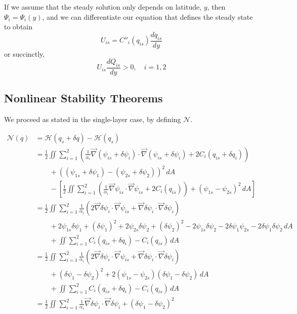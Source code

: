 \documentclass[12pt]{article}
\begin{document}
If we assume that the steady solution only depends on latitude, $y$, then $\Psi_i = \Psi_i(y)$, and we can differentiate our equation that defines the steady state to obtain
$$
U_{is} = C''_i(q_{is}) \frac{dq_{is}}{dy}
$$
or succinctly,
$$
U_{is} \frac{d Q_{is}}{dy} > 0, \quad i=1,2
$$

\subsection{Nonlinear Stability Theorems}
We proceed as stated in the single-layer case, by defining $\mathcal{N}$.

\begin{align*}
\mathcal{N}(q) 
& = \mathcal{H}(q_s + \delta q) - \mathcal{H}(q_s) \\
&= \frac12 \iint \sum_{i=1}^2 \left( \frac{1}{\alpha_i}\vec\nabla (\psi_{is} + \delta\psi_i) \cdot \vec\nabla (\psi_{is} + \delta\psi_i) + 2C_i(q_{is} + \delta q_i) \right) \\
&\quad\quad + ((\psi_{1s} + \delta\psi_1) - (\psi_{2s} + \delta\psi_2))^2 \, dA \\
&\quad\quad - \left[ \frac12 \iint \sum_{i=1}^2 \left( \frac{1}{\alpha_i}\vec\nabla \psi_{is} \cdot \vec\nabla \psi_{is} + 2C_i(q_{is}) \right) + (\psi_{1s} - \psi_{2s})^2 \, dA \right] \\
&= \frac12 \iint \sum_{i=1}^2 \frac{1}{\alpha_i} (2 \vec\nabla\delta\psi_i \cdot \vec\nabla\psi_{is} + \vec\nabla\delta\psi_i \cdot \vec\nabla\delta\psi_i) \\
&\quad\quad + 2\psi_{1s}\delta\psi_1 + (\delta\psi_1)^2 + 2\psi_{2s}\delta\psi_2 + (\delta\psi_2)^2 - 2\psi_{1s}\delta\psi_2 - 2\delta\psi_1\psi_{2s} - 2\delta\psi_1\delta\psi_2 \, dA \\
&\quad\quad + \iint \sum_{i=1}^2 C_i(q_{is} + \delta q_i) - C_i(q_{is}) \, dA \\
&= \frac12 \iint \sum_{i=1}^2 \frac{1}{\alpha_i} (2 \vec\nabla\delta\psi_i \cdot \vec\nabla\psi_{is} + \vec\nabla\delta\psi_i \cdot \vec\nabla\delta\psi_i) \\
&\quad\quad + (\delta\psi_1 - \delta\psi_2)^2 + 2(\psi_{1s} - \psi_{2s})(\delta\psi_1 - \delta\psi_2) \, dA \\
&\quad\quad + \iint \sum_{i=1}^2 C_i(q_{is} + \delta q_i) - C_i(q_{is}) \, dA \\
&= \frac12 \iint \sum_{i=1}^2 \frac{1}{\alpha_i} \vec\nabla\delta\psi_i \cdot \vec\nabla\delta\psi_i + (\delta\psi_1 - \delta\psi_2)^2 \\

\end{align*}
\end{document}
